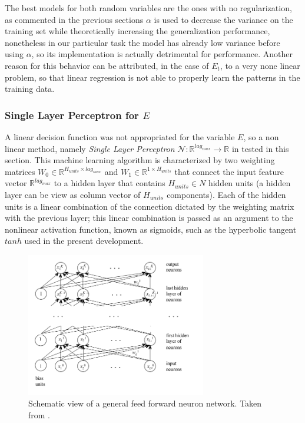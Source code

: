 The best models for both random variables are the ones with no regularization, as commented in the previous sections $\alpha$ is used to decrease the variance on the training set while theoretically increasing the generalization performance, nonetheless in our particular task the model has already low variance before using $\alpha$, so its implementation is actually detrimental for performance. Another reason for this behavior can be attributed, in the case of $E_{t}$, to a very none linear problem, so that linear regression is not able to properly learn the patterns in the training data. \\



\subsubsection{Single Layer Perceptron for $E$}

A linear decision function was not appropriated for the variable $E$, so a non linear method, namely \emph{Single Layer Perceptron}  $\mathcal{N}:\mathbb{R}^{lag_{max}} \rightarrow \mathbb{R}$ in tested in this section. This machine learning algorithm is characterized by two weighting matrices $W_{0} \in \mathbb{R}^{H_{units}\times lag_{max}} $ and $W_{1} \in \mathbb{R}^{1 \times H_{units}}$ that connect the input feature vector $\mathbb{R}^{lag_{max}}$ to a hidden layer that contains $H_{units} \in N$ hidden units (a hidden layer can be view as column vector of $H_{units}$ components). Each of the hidden units is a linear combination of the connection dictated by the weighting matrix with the previous layer; this linear combination is passed as an argument to the nonlinear activation function, known as sigmoids, such as the hyperbolic tangent $tanh$ used in the present development. 

\begin{figure}[htpb!] %
	\centering %
	\includegraphics[width=0.70\textwidth]{data/nn.png} %
	\caption{Schematic view of a general feed forward neuron network. Taken from  \cite{ml_jacobs_h}.} %
	\label{fig:nn} %
\end{figure}

